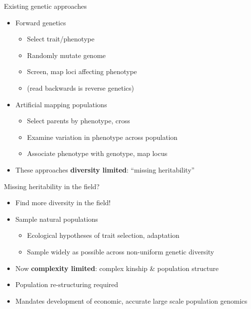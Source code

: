 \documentclass[t]{beamer}
\begin{document}
\begin{frame}{Existing genetic approaches}
  \begin{itemize}
    \item Forward genetics
      \begin{itemize}
        \item Select trait/phenotype
        \item Randomly mutate genome
        \item Screen, map loci affecting phenotype
        \item (read backwards is reverse genetics)
      \end{itemize}
    \item Artificial mapping populations
      \begin{itemize}
        \item Select parents by phenotype, cross
        \item Examine variation in phenotype across population
        \item Associate phenotype with genotype, map locus
      \end{itemize}
    \pause
  \item These approaches \textbf{diversity limited}: ``missing heritability''
  \end{itemize}
\end{frame}


\begin{frame}{Missing heritability in the field?}
  \begin{itemize}
    \item Find more diversity in the field!
    \item Sample natural populations
      \begin{itemize}
        \item Ecological hypotheses of trait selection, adaptation
        \item Sample widely as possible across non-uniform genetic diversity
      \end{itemize}
      \pause
    \item Now \textbf{complexity limited}: complex kinship \& population
      structure
    \item Population re-structuring required
      \pause
    \item Mandates development of economic, accurate large scale population
      genomics
  \end{itemize}
\end{frame}
\end{document}
